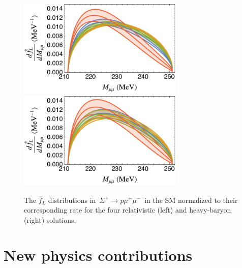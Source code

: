 \documentclass[amsmath,amssymb,aps,nofootinbib,prd,preprint,superscriptaddress,tightenlines,a4paper,bm]{revtex4-2}
\begin{document}
\begin{figure}[h] \bigskip
\includegraphics[width=3.1in]{compflrel.pdf} ~ ~ \includegraphics[width=3.1in]{compflhb.pdf} \vspace{-1ex}
\caption{The $\hat f_L^{}$ distributions in \,$\Sigma^+\to p \mu^+\mu^-$\, in the SM normalized to their corresponding rate for the four relativistic (left) and heavy-baryon (right) solutions.} \label{f:fldist}
\end{figure}



\section{New physics contributions\label{bsm}}
\end{document}
